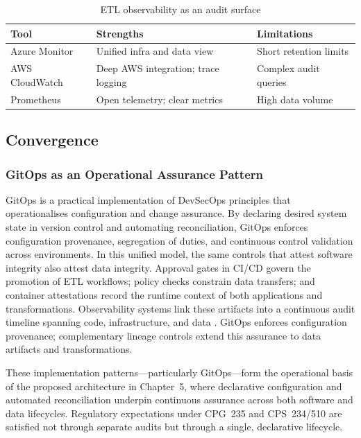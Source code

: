 \begin{table}[h]
  \centering
  \caption{ETL observability as an audit surface}
  \label{tab:observability-etl}
  \begin{tabular}{@{}lll@{}}
    \toprule
    Tool & Strengths & Limitations \\
    \midrule
    Azure Monitor & Unified infra and data view & Short retention limits \\
    AWS CloudWatch & Deep AWS integration; trace logging & Complex audit queries \\
    Prometheus & Open telemetry; clear metrics & High data volume \\
    \bottomrule
  \end{tabular}
\end{table}


\subsection*{Convergence}

\subsubsection*{GitOps as an Operational Assurance Pattern}
GitOps is a practical implementation of DevSecOps principles that
operationalises configuration and change assurance. By declaring desired system
state in version control and automating reconciliation, GitOps enforces
configuration provenance, segregation of duties, and continuous control
validation across environments. In this unified model, the same controls that
attest software integrity also attest data integrity. Approval gates in CI/CD
govern the promotion of ETL workflows; policy checks constrain data transfers;
and container attestations record the runtime context of both applications and
transformations. Observability systems link these artifacts into a continuous
audit timeline spanning code, infrastructure, and data
\cite{anisetti_devsecops-based_2022, souppaya_secure_2022,
gupta_prevalence_2022}. GitOps enforces configuration provenance; complementary
lineage controls extend this assurance to data artifacts and transformations.

These implementation patterns—particularly GitOps—form the operational basis of
the proposed architecture in Chapter~5, where declarative configuration and
automated reconciliation underpin continuous assurance across both software and
data lifecycles. Regulatory expectations under CPG~235 and CPS~234/510
\cite{cps234, cps510} are satisfied not through separate audits but through a
single, declarative lifecycle.

